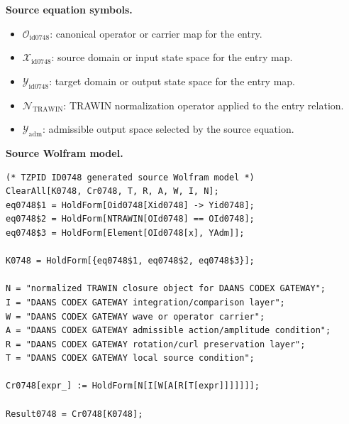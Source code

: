 \begin{minipage}[t]{0.49\linewidth}
\begingroup
\small
\raggedright
\textbf{Source equation symbols.}\par
\begin{itemize}[leftmargin=1.35em,itemsep=1pt,topsep=1pt,parsep=0pt]
    \item $\mathcal{O}_{\mathrm{id0748}}$: canonical operator or carrier map for the entry.
    \item $\mathcal{X}_{\mathrm{id0748}}$: source domain or input state space for the entry map.
    \item $\mathcal{Y}_{\mathrm{id0748}}$: target domain or output state space for the entry map.
    \item $\mathcal{N}_{\mathrm{TRAWIN}}$: TRAWIN normalization operator applied to the entry relation.
    \item $\mathcal{Y}_{\mathrm{adm}}$: admissible output space selected by the source equation.
\end{itemize}
\endgroup
\end{minipage}\hfill
\begin{minipage}[t]{0.47\linewidth}
\begingroup
\scriptsize
\raggedright
\textbf{Source Wolfram model.}\par
\begin{Verbatim}[fontsize=\tiny,breaklines=true,breakanywhere=true]
(* TZPID ID0748 generated source Wolfram model *)
ClearAll[K0748, Cr0748, T, R, A, W, I, N];
eq0748$1 = HoldForm[Oid0748[Xid0748] -> Yid0748];
eq0748$2 = HoldForm[NTRAWIN[OId0748] == OId0748];
eq0748$3 = HoldForm[Element[OId0748[x], YAdm]];

K0748 = HoldForm[{eq0748$1, eq0748$2, eq0748$3}];

N = "normalized TRAWIN closure object for DAANS CODEX GATEWAY";
I = "DAANS CODEX GATEWAY integration/comparison layer";
W = "DAANS CODEX GATEWAY wave or operator carrier";
A = "DAANS CODEX GATEWAY admissible action/amplitude condition";
R = "DAANS CODEX GATEWAY rotation/curl preservation layer";
T = "DAANS CODEX GATEWAY local source condition";

Cr0748[expr_] := HoldForm[N[I[W[A[R[T[expr]]]]]]];

Result0748 = Cr0748[K0748];
\end{Verbatim}
\endgroup
\end{minipage}

